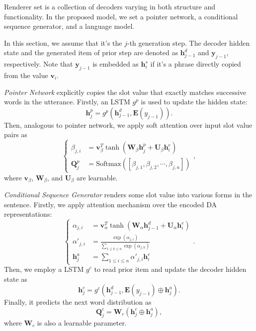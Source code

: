 \documentclass[letterpaper]{article} %
\begin{document}
Renderer set is a collection of decoders varying in both structure and functionality. In the proposed model, we set a pointer network, a conditional sequence generator, and a language model.

In this section, we assume that it's the $j$-th generation step. The decoder hidden state and the generated item of prior step are denoted as $\mathbf{h}_{j-1}^d$ and $\mathbf{y}_{j-1}$, respectively. Note that $\mathbf{y}_{j-1}$ is embedded as $\mathbf{h}_i^s$ if it's a phrase directly copied from the value $\mathbf{v}_i$.

\textit{Pointer Network} explicitly copies the slot value that exactly matches successive words in the utterance. Firstly, an LSTM $g^{p}$ is used to update the hidden state:
\begin{equation}
\mathbf{h}_j^p = g^p(\mathbf{h}_{j-1}^d, \mathbf{E}(y_{j-1})).
\end{equation}
Then, analogous to pointer network, we apply soft attention over input slot value pairs as
\begin{equation}
\left\{\begin{aligned}
\beta_{j,i} & = \mathbf{v}^T_{\beta} \tanh(\mathbf{W}_{\beta} \mathbf{h}^p_{j} + \mathbf{U}_{\beta}\mathbf{h}^e_i) \\
\mathbf{Q}^p_j & = \mathrm{Softmax}([\beta_{j, 1}, \beta_{j, 2}, \cdots, \beta_{j, n}])
\end{aligned}\right.,
\end{equation}
where $\mathbf{v}_{\beta}$, $\mathbf{W}_{\beta}$, and $\mathbf{U}_{\beta}$ are learnable.

\textit{Conditional Sequence Generator} renders some slot value into various forms in the sentence. Firstly, we apply attention mechanism over the encoded DA representations:
\begin{equation}
\left\{\begin{aligned}
\alpha_{j,i} & = \mathbf{v}^T_{\alpha} \tanh(\mathbf{W}_{\alpha} \mathbf{h}^d_{j - 1} + \mathbf{U}_{\alpha}\mathbf{h}^e_i) \\
\alpha'_{j,i} & = \frac{\exp(\alpha_{j,i})}{\sum_{1 \le k \le n} \exp(\alpha_{j,k})} \\
\mathbf{h}^a_j & = \sum_{1 \le i \le n} \alpha'_{j,i} \mathbf{h}_i^e
\end{aligned}\right..
\end{equation}
Then, we employ a LSTM $g^c$ to read prior item and update the decoder hidden state as
\begin{equation}
\mathbf{h}_j^c = g^c(\mathbf{h}_{j-1}^d, \mathbf{E}(y_{j-1}) \oplus \mathbf{h}^a_j).
\end{equation}
Finally, it predicts the next word distribution as
\begin{equation}
\mathbf{Q}_j^c = \mathbf{W}_{c} (\mathbf{h}^c_j \oplus \mathbf{h}^a_j),
\end{equation}
where $\mathbf{W}_{c}$ is also a learnable parameter.
\end{document}
